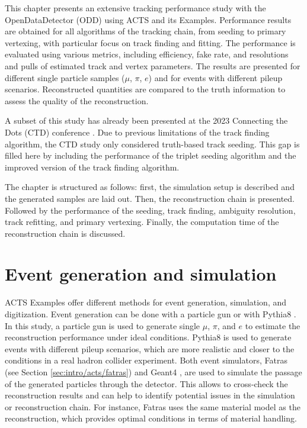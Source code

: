 This chapter presents an extensive tracking performance study with the OpenDataDetector (ODD) using ACTS and its Examples. Performance results are obtained for all algorithms of the tracking chain, from seeding to primary vertexing, with particular focus on track finding and fitting. The performance is evaluated using various metrics, including efficiency, fake rate, and resolutions and pulls of estimated track and vertex parameters. The results are presented for different single particle samples ($\mu$, $\pi$, $e$) and for \ttbar events with different pileup scenarios. Reconstructed quantities are compared to the truth information to assess the quality of the reconstruction.

A subset of this study has already been presented at the 2023 Connecting the Dots (CTD) conference \cite{ctd-acts-odd}. Due to previous limitations of the track finding algorithm, the CTD study only considered truth-based track seeding. This gap is filled here by including the performance of the triplet seeding algorithm and the improved version of the track finding algorithm.

The chapter is structured as follows: first, the simulation setup is described and the generated samples are laid out. Then, the reconstruction chain is presented. Followed by the performance of the seeding, track finding, ambiguity resolution, track refitting, and primary vertexing. Finally, the computation time of the reconstruction chain is discussed.

\section{Event generation and simulation}

ACTS Examples offer different methods for event generation, simulation, and digitization. Event generation can be done with a particle gun or with Pythia8 \cite{pythia8}. In this study, a particle gun is used to generate single $\mu$, $\pi$, and $e$ to estimate the reconstruction performance under ideal conditions. Pythia8 is used to generate \ttbar events with different pileup scenarios, which are more realistic and closer to the conditions in a real hadron collider experiment. Both event simulators, Fatras (see Section \ref{sec:intro/acts/fatras}) and Geant4 \cite{geant4-2003}\cite{geant4-2006}\cite{geant4-2016}, are used to simulate the passage of the generated particles through the detector. This allows to cross-check the reconstruction results and can help to identify potential issues in the simulation or reconstruction chain. For instance, Fatras uses the same material model as the reconstruction, which provides optimal conditions in terms of material handling.


